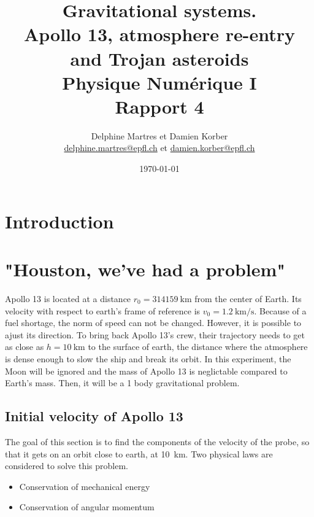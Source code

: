 \documentclass[a4paper,12pt,twoside]{article}
\newcommand{\mail}[1]{{\href{mailto:#1}{#1}}}
\begin{document}
\title{Gravitational systems.\\{\small Apollo 13, atmosphere re-entry and Trojan asteroids \\ Physique Numérique I}\\{\small Rapport 4}}
\date{\today}
\author{Delphine Martres et Damien Korber\\{\small \mail{delphine.martres@epfl.ch} et \mail{damien.korber@epfl.ch}}}
\maketitle
\tableofcontents %

\baselineskip=16pt
\parindent=15pt
\parskip=5pt
\newpage



\section{Introduction}

\section{"Houston, we've had a problem"}
Apollo 13 is located at a distance $r_0 = \SI{314159}{\kilo\meter}$ from the center of Earth.
Its velocity with respect to earth's frame of reference is $v_0 = \SI{1.2}{\kilo\meter\per\second}$.
Because of a fuel shortage, the norm of speed can not be changed.
However, it is possible to ajust its direction.
To bring back Apollo 13's crew, their trajectory needs to get as close as $h=\SI{10}{\kilo\meter}$ to the surface of earth, the distance where the atmosphere is dense enough to slow the ship and break its orbit.
In this experiment, the Moon will be ignored and the mass of Apollo 13 is neglictable compared to Earth's mass. Then, it will be a 1 body gravitational problem.

\subsection{Initial velocity of Apollo 13}
The goal of this section is to find the components of the velocity of the probe, so that it gets on an orbit close to earth, at \SI{10}{\kilo\meter}.
Two physical laws are considered to solve this problem. %
\begin{itemize}
  \item Conservation of mechanical energy
  \item Conservation of angular momentum
\end{itemize}
\end{document}
